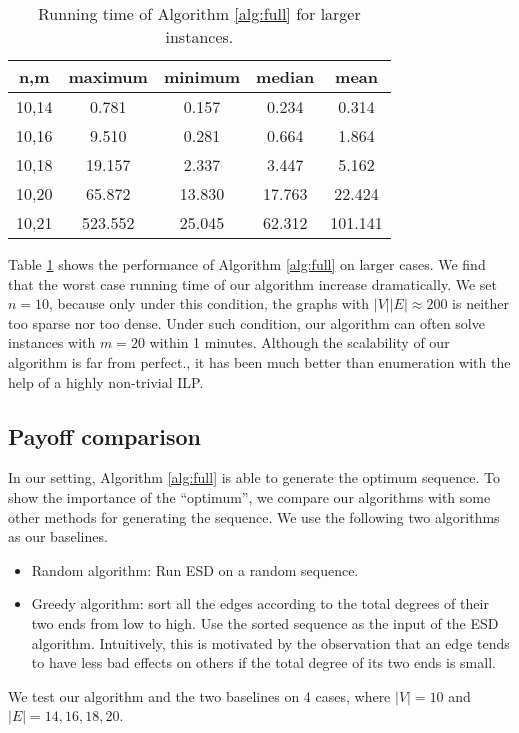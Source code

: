 \documentclass[letterpaper]{article}
\begin{document}
\begin{table}
	\caption{Running time of Algorithm \ref{alg:full} for larger instances.}
	\tiny
	\centering
	\label{tab2}
	\begin{tabular}{ccccc}
		\hline
		n,m & maximum & minimum & median & mean\\ \hline
		10,14 & 0.781&0.157&0.234&0.314\\
		10,16 & 9.510&0.281&0.664&1.864\\
		10,18 & 19.157&2.337&3.447&5.162\\
		10,20 & 65.872&13.830&17.763&22.424\\
		10,21 & 523.552&25.045&62.312&101.141\\ \hline
	\end{tabular}
\end{table}

Table \ref{tab2} shows the performance of Algorithm \ref{alg:full} on larger cases.
We find that the worst case running time of our algorithm increase dramatically.
We set $n=10$, because only under this condition, the graphs with $|V||E|\approx200$ is neither too sparse nor too dense.
Under such condition, our algorithm can often solve instances with $m=20$ within 1 minutes.
Although the scalability of our algorithm is far from perfect., it has been much better than enumeration with the help of a highly non-trivial ILP.

\subsection{Payoff comparison}

In our setting, Algorithm \ref{alg:full} is able to generate the optimum sequence.
To show the importance of the ``optimum'', we compare our algorithms with some other methods for generating the sequence.
We use the following two algorithms as our baselines.
\begin{itemize}
	\item Random algorithm: Run ESD on a random sequence.
	\item Greedy algorithm: sort all the edges according to the total degrees of their two ends from low to high. Use the sorted sequence as the input of the ESD algorithm. Intuitively, this is motivated by the observation that an edge tends to have less bad effects on others if the total degree of its two ends is small.
\end{itemize}
We test our algorithm and the two baselines on 4 cases, where $|V|=10$ and $|E|=14,16,18,20$.
\end{document}
